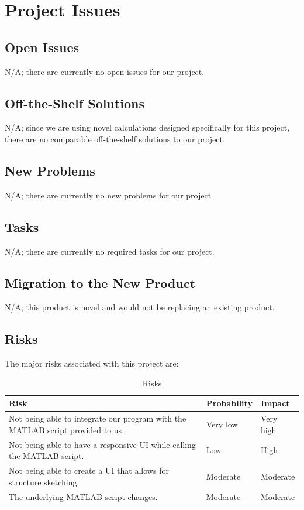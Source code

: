 \documentclass[12pt]{article}
\begin{document}
\section{Project Issues}

\subsection{Open Issues}

N/A; there are currently no open issues for our project.

\subsection{Off-the-Shelf Solutions}

N/A; since we are using novel calculations designed specifically for this project, there are no comparable off-the-shelf solutions to our project.

\subsection{New Problems}

N/A; there are currently no new problems for our project

\subsection{Tasks}

N/A; there are currently no required tasks for our project.

\subsection{Migration to the New Product}

N/A; this product is novel and would not be replacing an existing product.

\subsection{Risks}

The major risks associated with this project are:

\begin{table}[H]
\caption{Risks} \label{TblRisks}
\begin{tabular}{p{}|p{}|p{}}
\toprule
\textbf{Risk} & \textbf{Probability} & \textbf{Impact}\\
\midrule
Not being able to integrate our program with the MATLAB script provided to us. & Very low & Very high\\
\midrule
Not being able to have a responsive UI while calling the MATLAB script. & Low & High\\
\midrule
Not being able to create a UI that allows for structure sketching. & Moderate & Moderate\\
\midrule
The underlying MATLAB script changes. & Moderate & Moderate\\
\bottomrule
\end{tabular}
\end{table}
\end{document}
